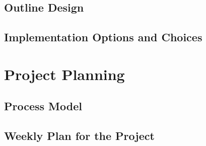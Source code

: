 \documentclass[11pt,fleqn,twoside]{article}
\begin{document}
\subsection{Outline Design}

\subsection{Implementation Options and Choices}

\section{Project Planning}


\subsection{Process Model}

\subsection{Weekly Plan for the Project}
\end{document}
